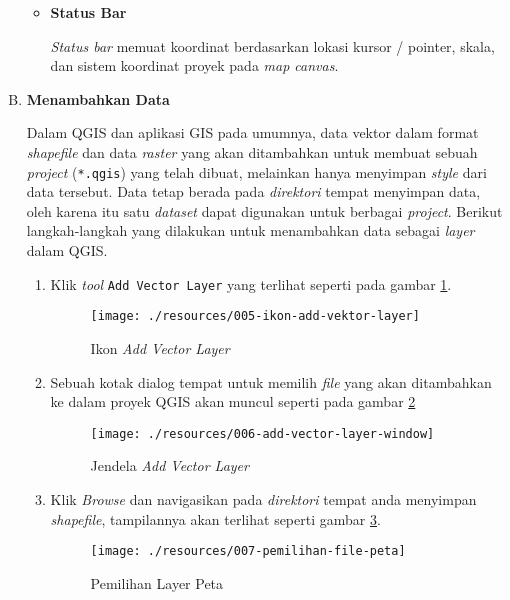 \begin{enumerate}[A.]
\begin{itemize}
\item \textbf{Status Bar}

\textit{Status bar} memuat koordinat berdasarkan lokasi kursor / pointer, skala, dan sistem koordinat proyek pada \textit{map canvas}.

\end{itemize}

\item \textbf{Menambahkan Data}

Dalam QGIS dan aplikasi GIS pada umumnya, data vektor dalam format \textit{shapefile} dan data \textit{raster} yang akan ditambahkan untuk membuat sebuah \textit{project} (\texttt{*.qgis}) yang telah dibuat, melainkan hanya menyimpan \textit{style} dari data tersebut. Data tetap berada pada \textit{direktori} tempat menyimpan data, oleh karena itu satu \textit{dataset} dapat digunakan untuk berbagai \textit{project}. Berikut langkah-langkah yang dilakukan untuk menambahkan data sebagai \textit{layer} dalam QGIS.

\begin{enumerate}[1.]
  \item Klik \textit{tool} \texttt{Add Vector Layer} yang terlihat seperti pada gambar \ref{fig:addvectorlayer}.
  
\begin{figure}[H]
  \centering
  \texttt{[image: ./resources/005-ikon-add-vektor-layer]}
  \caption{Ikon \textit{Add Vector Layer}}
  \label{fig:addvectorlayer}
\end{figure}

  \item Sebuah kotak dialog tempat untuk memilih \textit{file} yang akan ditambahkan ke dalam proyek QGIS akan muncul seperti pada gambar \ref{fig:addvectorlayerwindow}
  
\begin{figure}[H]
  \centering
  \texttt{[image: ./resources/006-add-vector-layer-window]}
  \caption{Jendela \textit{Add Vector Layer}}
  \label{fig:addvectorlayerwindow}
\end{figure}

  \item Klik \textit{Browse} dan navigasikan pada \textit{direktori} tempat anda menyimpan \textit{shapefile}, tampilannya akan terlihat seperti gambar \ref{fig:pemilihanfilepeta}.
  
\begin{figure}[H]
  \centering
  \texttt{[image: ./resources/007-pemilihan-file-peta]}
  \caption{Pemilihan Layer Peta}
  \label{fig:pemilihanfilepeta}
\end{figure}


\end{enumerate}
\end{enumerate}
